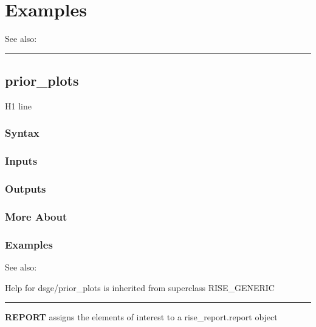 \documentclass[letterpaper,10pt,english]{sphinxmanual}
\begin{document}
\section{Examples}
\label{classes/models/@dsge/dsge:id132}
See also:


\bigskip\hrule{}\bigskip



\subsection{prior\_plots}
\label{classes/models/@dsge/dsge:id133}\label{classes/models/@dsge/dsge:prior-plots}
H1 line


\subsubsection{Syntax}
\label{classes/models/@dsge/dsge:id134}

\subsubsection{Inputs}
\label{classes/models/@dsge/dsge:id135}

\subsubsection{Outputs}
\label{classes/models/@dsge/dsge:id136}

\subsubsection{More About}
\label{classes/models/@dsge/dsge:id137}

\subsubsection{Examples}
\label{classes/models/@dsge/dsge:id138}
See also:

Help for dsge/prior\_plots is inherited from superclass RISE\_GENERIC


\bigskip\hrule{}\bigskip

\label{classes/models/@dsge/dsge:report}
\textbf{REPORT} assigns the elements of interest to a rise\_report.report object
\end{document}
